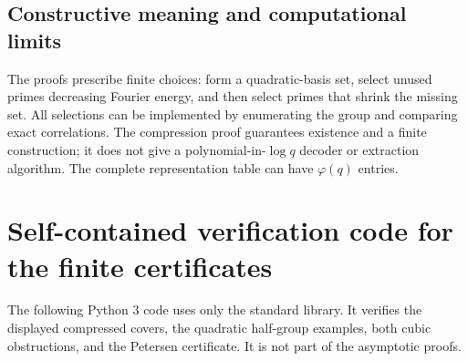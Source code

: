 \documentclass[11pt,a4paper]{article}
\theoremstyle{definition}
\theoremstyle{remark}
\begin{document}
\subsection{Constructive meaning and computational limits}
The proofs prescribe finite choices: form a quadratic-basis set,
select unused primes decreasing Fourier energy, and then select primes
that shrink the missing set. All selections can be implemented by
enumerating the group and comparing exact correlations. The compression
proof guarantees existence and a finite construction; it does not give
a polynomial-in-$\log q$ decoder or extraction algorithm. The complete
representation table can have $\varphi(q)$ entries.



\section{Self-contained verification code for the finite certificates}
The following Python 3 code uses only the standard library. It verifies
the displayed compressed covers, the quadratic half-group examples,
both cubic obstructions, and the Petersen certificate. It is not part of
the asymptotic proofs.
\end{document}
